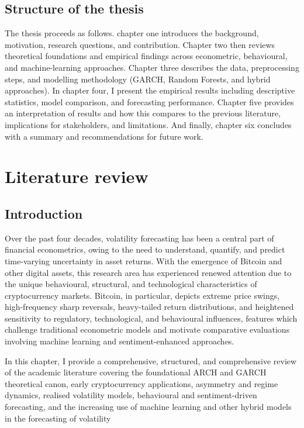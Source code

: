 \documentclass[12pt]{report}
\begin{document}
\section{Structure of the thesis}

The thesis proceeds as follows. chapter one introduces the background, motivation, research questions, and contribution. Chapter two then reviews theoretical foundations and empirical findings across econometric, behavioural, and machine-learning approaches. Chapter three describes the data, preprocessing steps, and modelling methodology (GARCH, Random Forests, and hybrid approaches). In chapter four, I present the  empirical results including descriptive statistics, model comparison, and forecasting performance. Chapter five provides an interpretation of results and how this compares to the previous literature, implications for stakeholders, and limitations. And finally, chapter six concludes with a summary and recommendations for future work.


\newpage

\chapter{Literature review}

\section{Introduction}
Over the past four decades, volatility forecasting has been a central part of financial econometrics, owing to the need to understand, quantify, and predict time-varying uncertainty in asset returns. With the emergence of Bitcoin and other digital assets, this research area has experienced renewed attention due to the unique behavioural, structural, and technological characteristics of cryptocurrency markets. Bitcoin, in particular, depicts extreme price swings, high-frequency sharp reversals, heavy-tailed return distributions, and heightened sensitivity to regulatory, technological, and behavioural influences, features which challenge traditional econometric models and motivate comparative evaluations involving machine learning and sentiment-enhanced approaches.

In this chapter, I provide a comprehensive, structured, and comprehensive review of the academic literature covering the foundational ARCH and GARCH theoretical canon, early cryptocurrency applications, asymmetry and regime dynamics, realised volatility models, behavioural and sentiment-driven forecasting, and the increasing use of machine learning and other hybrid models in the forecasting of volatility
\end{document}
